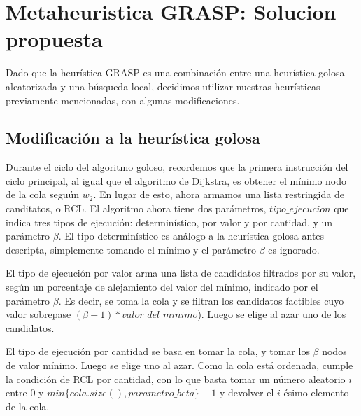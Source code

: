 \section{Metaheuristica GRASP: Solucion propuesta}

Dado que la heur\'istica GRASP es una combinaci\'on entre una heur\'istica golosa aleatorizada y una b\'usqueda local, decidimos utilizar nuestras heur\'isticas previamente mencionadas, con algunas modificaciones.

\subsection{Modificaci\'on a la heur\'istica golosa}

\vspace{2mm}

Durante el ciclo del algoritmo goloso, recordemos que la primera instrucci\'on del ciclo principal, al igual que el algoritmo de Dijkstra, es obtener el m\'inimo nodo de la cola segu\'un $w_2$. En lugar de esto, ahora armamos una lista restringida de canditatos, o RCL. El algoritmo ahora tiene dos par\'ametros, $tipo\_ejecucion$ que indica tres tipos de ejecuci\'on: determin\'istico, por valor y por cantidad, y un par\'ametro $\beta$. El tipo determin\'istico es an\'alogo a la heur\'istica golosa antes descripta, simplemente tomando el m\'inimo y el par\'ametro $\beta$ es ignorado.

\vspace{2mm}

El tipo de ejecuci\'on por valor arma una lista de candidatos filtrados por su valor, seg\'un un porcentaje de alejamiento del valor del m\'inimo, indicado por el par\'ametro $\beta$. Es decir, se toma la cola y se filtran los candidatos factibles cuyo valor sobrepase $(\beta + 1)*valor\_del\_minimo$). Luego se elige al azar uno de los candidatos.

\vspace{2mm}

El tipo de ejecuci\'on por cantidad se basa en tomar la cola, y tomar los $\beta$ nodos de valor m\'inimo. Luego se elige uno al azar. Como la cola est\'a ordenada, cumple la condici\'on de RCL por cantidad, con lo que basta tomar un n\'umero aleatorio $i$ entre $0$ y  $min\{cola.size(), parametro\_beta\} -1$ y devolver el $i$-\'esimo elemento de la cola.

\vspace{2mm}


